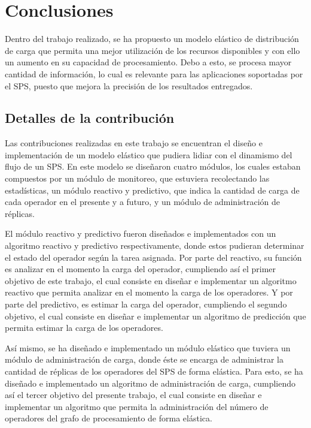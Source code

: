 \chapter{Conclusiones}
\label{cap:conclusiones}
Dentro del trabajo realizado, se ha propuesto un modelo elástico de distribución de carga que permita una mejor utilización de los recursos disponibles y con ello un aumento en su capacidad de procesamiento. Debo a esto, se procesa mayor cantidad de información, lo cual es relevante para las aplicaciones soportadas por el SPS, puesto que mejora la precisión de los resultados entregados.

\section{Detalles de la contribución}
Las contribuciones realizadas en este trabajo se encuentran el diseño e implementación de un modelo elástico que pudiera lidiar con el dinamismo del flujo de un SPS. En este modelo se diseñaron cuatro módulos, los cuales estaban compuestos por un módulo de monitoreo, que estuviera recolectando las estadísticas, un módulo reactivo y predictivo, que indica la cantidad de carga de cada operador en el presente y a futuro, y un módulo de administración de réplicas.

El módulo reactivo y predictivo fueron diseñados e implementados con un algoritmo reactivo y predictivo respectivamente, donde estos pudieran determinar el estado del operador según la tarea asignada. Por parte del reactivo, su función es analizar en el momento la carga del operador, cumpliendo así el primer objetivo de este trabajo, el cual consiste en dise\~nar e implementar un algoritmo reactivo que permita analizar en el momento la carga de los operadores. Y por parte del predictivo, es estimar la carga del operador, cumpliendo el segundo objetivo, el cual consiste en dise\~nar e implementar un algoritmo de predicci\'on que permita estimar la carga de los operadores.

Así mismo, se ha diseñado e implementado un módulo elástico que tuviera un módulo de administración de carga, donde éste se encarga de administrar la cantidad de réplicas de los operadores del SPS de forma elástica. Para esto, se ha diseñado e implementado un algoritmo de administración de carga, cumpliendo así el tercer objetivo del presente trabajo, el cual consiste en dise\~nar e implementar un algoritmo que permita la administraci\'on del número de operadores del grafo de procesamiento de forma el\'astica.

